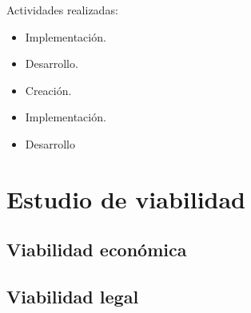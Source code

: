 Actividades realizadas:
\begin{itemize}
\tightlist
\item
Implementación.
\item
Desarrollo.
\item
Creación.
\item
Implementación.
\item
Desarrollo
\end{itemize}








\section{Estudio de viabilidad}


\subsection{Viabilidad económica}


\subsection{Viabilidad legal}


